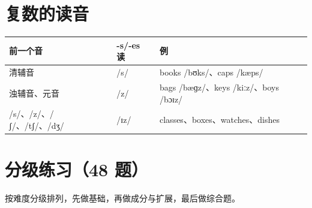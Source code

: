 \documentclass[11pt,a4paper]{ctexart}
\begin{document}
\section{复数的读音}
\begin{center}
\begin{tabular}{p{5.4cm}p{2.6cm}p{5.2cm}}
\hline
\textbf{前一个音} & \textbf{-s/-es 读} & \textbf{例}\\
\hline
清辅音 & /s/ & books /bʊks/、caps /kæps/\\
浊辅音、元音 & /z/ & bags /bæɡz/、keys /kiːz/、boys /bɔɪz/\\
/s/、/z/、/ʃ/、/tʃ/、/dʒ/ & /ɪz/ & classes、boxes、watches、dishes\\
\hline
\end{tabular}
\end{center}


\newpage
\section{分级练习（48 题）}
\noindent 按难度分级排列，先做基础，再做成分与扩展，最后做综合题。
\end{document}
